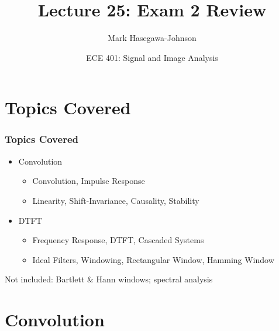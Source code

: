 \documentclass{beamer}
\title{Lecture 25: Exam 2 Review}
\author{Mark Hasegawa-Johnson}
\date{ECE 401: Signal and Image Analysis}
\begin{document}
\begin{frame}
  \maketitle
\end{frame}

\begin{frame}
  \tableofcontents
\end{frame}

\section[Topics]{Topics Covered}
\setcounter{subsection}{1}

\begin{frame}
  \frametitle{Topics Covered}

  \begin{itemize}
  \item Convolution
    \begin{itemize}
    \item Convolution, Impulse Response
    \item Linearity, Shift-Invariance, Causality, Stability
    \end{itemize}
  \item DTFT
    \begin{itemize}
    \item Frequency Response, DTFT, Cascaded Systems
    \item Ideal Filters, Windowing, Rectangular Window, Hamming Window
    \end{itemize}
  \end{itemize}
  Not included: Bartlett \& Hann windows; spectral analysis
\end{frame}

\section[Convolution]{Convolution}
\setcounter{subsection}{1}
\end{document}
